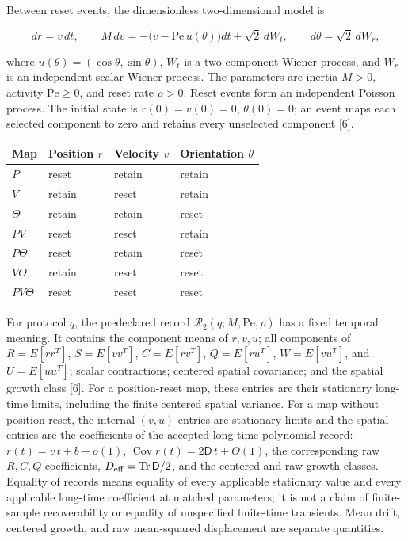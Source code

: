 Between reset events, the dimensionless two-dimensional model is

\[
d r=v\,dt,\qquad
M\,dv=-\bigl(v-\mathrm{Pe}\,u(\theta)\bigr)dt+\sqrt{2}\,dW_t,
\qquad d\theta=\sqrt{2}\,dW_r,
\]

where \(u(\theta)=(\cos\theta,\sin\theta)\), \(W_t\) is a two-component Wiener process, and \(W_r\) is an independent scalar Wiener process. The parameters are inertia \(M>0\), activity \(\mathrm{Pe}\ge0\), and reset rate \(\rho>0\). Reset events form an independent Poisson process. The initial state is \(r(0)=v(0)=0\), \(\theta(0)=0\); an event maps each selected component to zero and retains every unselected component {[}6{]}.

{\def\LTcaptype{none} %
\begin{longtable}[]{@{}llll@{}}
\toprule\noalign{}
Map & Position \(r\) & Velocity \(v\) & Orientation \(\theta\) \\
\midrule\noalign{}
\endhead
\bottomrule\noalign{}
\endlastfoot
\(P\) & reset & retain & retain \\
\(V\) & retain & reset & retain \\
\(\Theta\) & retain & retain & reset \\
\(PV\) & reset & reset & retain \\
\(P\Theta\) & reset & retain & reset \\
\(V\Theta\) & retain & reset & reset \\
\(PV\Theta\) & reset & reset & reset \\
\end{longtable}
}

For protocol \(q\), the predeclared record \(\mathcal R_2(q;M,\mathrm{Pe},\rho)\) has a fixed temporal meaning. It contains the component means of \(r,v,u\); all components of \(R=E[rr^T]\), \(S=E[vv^T]\), \(C=E[rv^T]\), \(Q=E[ru^T]\), \(W=E[vu^T]\), and \(U=E[uu^T]\); scalar contractions; centered spatial covariance; and the spatial growth class {[}6{]}. For a position-reset map, these entries are their stationary long-time limits, including the finite centered spatial variance. For a map without position reset, the internal \((v,u)\) entries are stationary limits and the spatial entries are the coefficients of the accepted long-time polynomial record: \(\bar r(t)=\bar v\,t+b+o(1)\), \(\operatorname{Cov}r(t)=2\mathsf D\,t+O(1)\), the corresponding raw \(R,C,Q\) coefficients, \(D_{\rm eff}=\operatorname{Tr}\mathsf D/2\), and the centered and raw growth classes. Equality of records means equality of every applicable stationary value and every applicable long-time coefficient at matched parameters; it is not a claim of finite-sample recoverability or equality of unspecified finite-time transients. Mean drift, centered growth, and raw mean-squared displacement are separate quantities.

